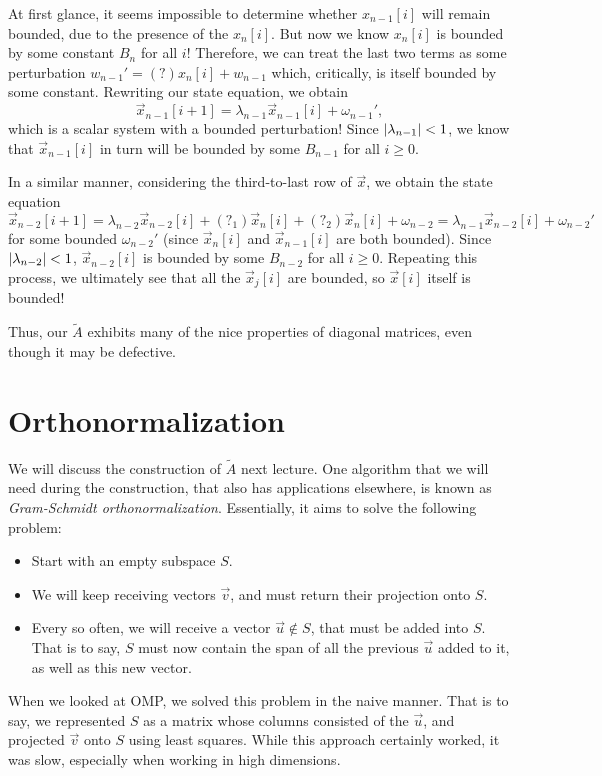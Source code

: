 \documentclass[letterpaper]{article}
\theoremstyle{remark}
\renewcommand{\tilde}[1]{\widetilde{#1}}
\begin{document}
At first glance, it seems impossible to determine whether $x_{n-1}[i]$ will remain bounded, due to the presence of the $x_n[i]$. But now we know $x_n[i]$ is bounded by some constant $B_n$ for all $i$! Therefore, we can treat the last two terms as some perturbation $w_{n-1}' = (?)x_n[i] + w_{n-1}$ which, critically, is itself bounded by some constant. Rewriting our state equation, we obtain
\[
    \vec{x}_{n-1}[i + 1] = \lambda_{n-1}\vec{x}_{n-1}[i] + \omega_{n-1}',
\]
which is a scalar system with a bounded perturbation! Since $\abs{\lambda_{n-1}} < 1$, we know that $\vec{x}_{n-1}[i]$ in turn will be bounded by some $B_{n-1}$ for all $i \ge 0$.

In a similar manner, considering the third-to-last row of $\vec{x}$, we obtain the state equation
\[
    \vec{x}_{n-2}[i+1] = \lambda_{n-2}\vec{x}_{n-2}[i] + (?_1)\vec{x}_n[i] + (?_2)\vec{x}_n[i] + \omega_{n-2} = \lambda_{n-1}\vec{x}_{n-2}[i] + \omega_{n-2}'
\]
for some bounded $\omega_{n-2}'$ (since $\vec{x}_n[i]$ and $\vec{x}_{n-1}[i]$ are both bounded). Since $\abs{\lambda_{n-2}} < 1$, $\vec{x}_{n-2}[i]$ is bounded by some $B_{n-2}$ for all $i \ge 0$. Repeating this process, we ultimately see that all the $\vec{x}_j[i]$ are bounded, so $\vec{x}[i]$ itself is bounded!

Thus, our $\tilde{A}$ exhibits many of the nice properties of diagonal matrices, even though it may be defective.

\section{Orthonormalization}
We will discuss the construction of $\tilde{A}$ next lecture. One algorithm that we will need during the construction, that also has applications elsewhere, is known as \emph{Gram-Schmidt orthonormalization}. Essentially, it aims to solve the following problem:
\begin{itemize}
    \item Start with an empty subspace $S$.
    \item We will keep receiving vectors $\vec{v}$, and must return their projection onto $S$.
    \item Every so often, we will receive a vector $\vec{u} \not\in S$, that must be added into $S$. That is to say, $S$ must now contain the span of all the previous $\vec{u}$ added to it, as well as this new vector.
\end{itemize}

When we looked at OMP, we solved this problem in the naive manner. That is to say, we represented $S$ as a matrix whose columns consisted of the $\vec{u}$, and projected $\vec{v}$ onto $S$ using least squares. While this approach certainly worked, it was slow, especially when working in high dimensions. 
\end{document}

